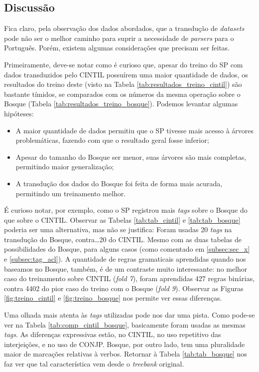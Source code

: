 \subsection{Discussão}
\label{subsec:resultados_discussao}

Fica claro, pela observação dos dados abordados, que a transdução de \textit{datasets} pode não ser o melhor caminho para suprir a necessidade de \textit{parsers} para o Português. Porém, existem algumas considerações que precisam ser feitas.

Primeiramente, deve-se notar como é curioso que, apesar do treino do SP com dados transduzidos pelo CINTIL possuírem uma maior quantidade de dados, os resultados do treino deste (visto na Tabela \ref{tab:resultados_treino_cintil}) são bastante tímidos, se comparados com os números da mesma operação sobre o Bosque (Tabela \ref{tab:resultados_treino_bosque}). Podemos levantar algumas hipóteses: 
\begin{itemize}
    \item A maior quantidade de dados permitiu que o SP tivesse mais acesso à árvores problemáticas, fazendo com que o resultado geral fosse inferior;
    \item Apesar do tamanho do Bosque ser menor, suas árvores são mais completas, permitindo maior generalização;
    \item A transdução dos dados do Bosque foi feita de forma mais acurada, permitindo um treinamento melhor.
\end{itemize}

É curioso notar, por exemplo, como o SP registrou mais \textit{tags} sobre o Bosque do que sobre o CINTIL. Observar as Tabelas \ref{tab:tab_cintil} e \ref{tab:tab_bosque} poderia ser uma alternativa, mas não se justifica: Foram usadas 20 \textit{tags} na transdução do Bosque, contra\ldots 20 do CINTIL. Mesmo com as duas tabelas de possibilidades do Bosque, para alguns casos (como comentado em \ref{subsec:sec_x} e \ref{subsec:tag_acl}). A quantidade de regras gramaticais aprendidas quando nos baseamos no Bosque, também, é de um contraste muito interessante: no melhor caso do treinamento sobre CINTIL (\textit{fold 7}), foram aprendidas 427 regras binárias, contra 4402 do pior caso do treino com o Bosque (\textit{fold 9}). Observar as Figuras \ref{fig:treino_cintil} e \ref{fig:treino_bosque} nos permite ver essas diferenças.

Uma olhada mais atenta às \textit{tags} utilizadas pode nos dar uma pista. Como pode-se ver na Tabela \ref{tab:comp_cintil_bosque}, basicamente foram usadas as mesmas \textit{tags}. As diferenças expressivas estão, no CINTIL, no uso repetitivo das interjeições, e no uso de CONJP. Bosque, por outro lado, tem uma pluralidade maior de marcações relativas à verbos. Retornar à Tabela \ref{tab:tab_bosque} nos faz ver que tal característica vem desde o \textit{treebank} original. 
\begin{center}
    
\end{center}

